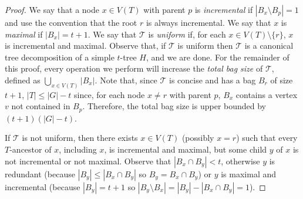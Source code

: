 \documentclass[kpfonts]{patmorin}
\theoremstyle{named}
\begin{document}
\begin{proof}
    We say that a node $x\in V(T)$ with parent $p$ is \emph{incremental} if $|B_x\setminus B_p|=1$ and use the convention that the root $r$ is always incremental.  We say that $x$ is \emph{maximal} if $|B_x|=t+1$.  We say that $\mathcal{T}$ is \emph{uniform} if, for each $x\in V(T)\setminus\{r\}$, $x$ is incremental and maximal.  Observe that, if $\mathcal{T}$ is uniform then $\mathcal{T}$ is a canonical tree decomposition of a simple $t$-tree $H$, and we are done.  For the remainder of this proof, every operation we perform will increase the \emph{total bag size} of $\mathcal{T}$, defined as $\bigcup_{x\in V(T)} |B_x|$.  Note that, since $\mathcal{T}$ is concise and has a bag $B_r$ of size $t+1$, $|T|\le |G|-t$ since, for each node $x\neq r$ with parent $p$, $B_x$ contains a vertex $v$ not contained in $B_p$. Therefore, the total bag size is upper bounded by $(t+1)(|G|-t)$.

    If $\mathcal{T}$ is not uniform, then there exists $x\in V(T)$ (possibly $x=r$) such that every $T$-ancestor of $x$, including $x$, is incremental and maximal, but some child $y$ of $x$ is not incremental or not maximal.  Observe that $|B_x\cap B_y| < t$, otherwise $y$ is redundant (because $|B_y|\le |B_x\cap B_y|$ so $B_y=B_x\cap B_y$) or $y$ is maximal and incremental (because $|B_y|=t+1$ so $|B_y\setminus B_x|=|B_y|-|B_x\cap B_y|=1$).



\end{proof}
\end{document}
